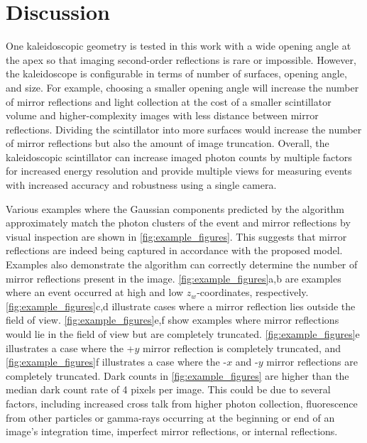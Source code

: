 \section{Discussion}

One kaleidoscopic geometry is tested in this work with a wide opening angle at the 
apex so that imaging second-order reflections is rare or impossible. 
However, the kaleidoscope is configurable in terms of number of surfaces, opening 
angle, and size.
For example, choosing a smaller opening angle will increase the number of mirror 
reflections and light collection at the cost of a smaller scintillator volume and 
higher-complexity images with less distance between mirror reflections.
Dividing the scintillator into more surfaces would increase the number of mirror 
reflections but also the amount of image truncation.
Overall, the kaleidoscopic scintillator can increase imaged photon counts by 
multiple factors for increased energy resolution and provide multiple views for 
measuring events with increased accuracy and robustness using a single camera.

Various examples where the Gaussian components predicted by the 
algorithm approximately match the photon clusters of the event and mirror 
reflections by visual inspection are shown in \cref{fig:example_figures}.
This suggests that mirror reflections are indeed being captured in accordance with 
the proposed model.
Examples also demonstrate the algorithm can correctly determine the number of 
mirror reflections present in the image.
\cref{fig:example_figures}a,b are examples where an event occurred at high and 
low $z_w$-coordinates, respectively.
\cref{fig:example_figures}c,d illustrate cases where a mirror reflection lies 
outside the field of view. 
\cref{fig:example_figures}e,f show examples where mirror reflections would lie in 
the field of view but are completely truncated.
\cref{fig:example_figures}e illustrates a case where the +$y$ mirror reflection is 
completely truncated, and \cref{fig:example_figures}f illustrates a case where the 
-$x$ and -$y$ mirror reflections are completely truncated.
Dark counts in \cref{fig:example_figures} are higher than the median dark count 
rate of 4 pixels per image.
This could be due to several factors, including increased cross talk from higher 
photon collection, fluorescence from other particles or gamma-rays occurring at 
the beginning or end of an image's integration time, imperfect mirror reflections, 
or internal reflections.


